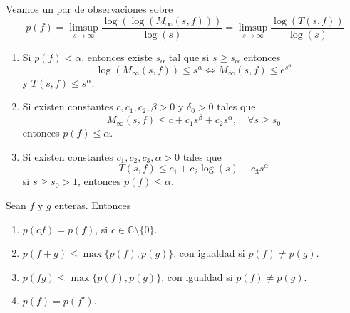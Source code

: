 \begin{remark}
    Veamos un par de observaciones sobre
    $$p(f) = \limsup_{s \to \infty} \frac{\log(\log(M_\infty(s, f)))}{\log(s)} = \limsup_{s \to \infty} \frac{\log(T(s, f))}{\log(s)}$$
    \begin{enumerate}
        \item Si $p(f) < \alpha$, entonces existe $s_\alpha$ tal que si $s \geq s_\alpha$ entonces
              $$\log(M_\infty(s, f)) \leq s^\alpha \Leftrightarrow M_\infty(s, f) \leq e^{s^\alpha}$$
              y $T(s, f) \leq s^\alpha$.

        \item Si existen constantes $c, c_1, c_2, \beta > 0$ y $\delta_0 > 0$ tales que
              $$M_\infty(s, f) \leq c + c_1s^\beta + c_2s^\alpha, \quad \forall s \geq s_0$$
              entonces $p(f) \leq \alpha$.

        \item Si existen constantes $c_1, c_2, c_3, \alpha > 0$ tales que
              $$T(s, f) \leq c_1 + c_2\log(s) + c_3s^\alpha$$
              si $s \geq s_0 > 1$, entonces $p(f) \leq \alpha$.
    \end{enumerate}
\end{remark}

\begin{theorem}
    Sean $f$ y $g$ enteras.
    Entonces
    \begin{enumerate}
        \item $p(cf) = p(f)$, si $c \in \mathbb{C} \setminus \{0\}$.
        \item $p(f+g) \leq \max\{p(f), p(g)\}$, con igualdad si $p(f) \neq p(g)$.
        \item $p(fg) \leq \max\{p(f), p(g)\}$, con igualdad si $p(f) \neq p(g)$.
        \item $p(f) = p(f')$.
    \end{enumerate}
\end{theorem}